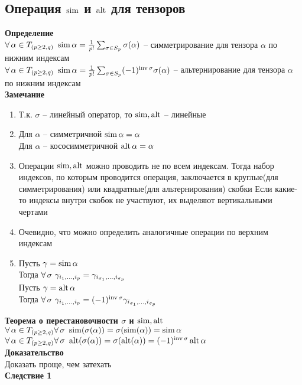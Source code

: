 \documentclass[12pt]{article}
\begin{document}
\subsection{Операция $\operatorname{sim}$ и $\operatorname{alt}$ для тензоров}
\textbf{Определение}\\
$\forall\, \alpha\in T_{(p \geq 2, q)}\ \operatorname{sim} \alpha = \frac1{p!}\sum_{\sigma\in S_p} \sigma(\alpha)$ -- симметрирование для тензора $\alpha$ по нижним индексам\\
$\forall\, \alpha\in T_{(p \geq 2, q)}\ \operatorname{sim} \alpha = \frac1{p!}\sum_{\sigma\in S_p} (-1)^{\operatorname{inv} \sigma}\sigma(\alpha)$ -- альтернирование для тензора $\alpha$ по нижним индексам\\
\textbf{Замечание}
\begin{enumerate}
    \item Т.к. $\sigma$ -- линейный оператор, то $\operatorname{sim}, \operatorname{alt}$ -- линейные
    \item Для $\alpha$ -- симметричной $\operatorname{sim} \alpha = \alpha$\\
    Для $\alpha$ -- кососимметричной $\operatorname{alt} \alpha = \alpha$
    \item Операции $\operatorname{sim}, \operatorname{alt}$ можно проводить не по всем индексам. Тогда набор индексов, по которым проводится операция, заключается в круглые(для симметрирования) или квадратные(для альтернирования) скобки
    Если какие-то индексы внутри скобок не участвуют, их выделяют вертикальными чертами
    \item Очевидно, что можно определить аналогичные операции по верхним индексам
    \item Пусть $\gamma = \operatorname{sim} \alpha$\\
    Тогда $\forall\, \sigma\ \gamma_{i_1,\ldots, i_p} = \gamma_{i_{\sigma_1},\ldots,i_{\sigma_p}}$\\
    Пусть $\gamma = \operatorname{alt} \alpha$\\
    Тогда $\forall\, \sigma\ \gamma_{i_1,\ldots, i_p} = (-1)^{\operatorname{inv} \sigma}\gamma_{i_{\sigma_1},\ldots,i_{\sigma_p}}$
\end{enumerate}
\textbf{Теорема о перестановочности $\sigma$ и $\operatorname{sim}, \operatorname{alt}$}\\
$\forall\, \alpha \in T_{(p \geq 2,q)} \forall\, \sigma\ \operatorname{sim}(\sigma(\alpha)) = \sigma(\operatorname{sim}(\alpha)) = \operatorname{sim} \alpha$
$\forall\, \alpha \in T_{(p \geq 2,q)} \forall\, \sigma\ \operatorname{alt}(\sigma(\alpha)) = \sigma(\operatorname{alt}(\alpha)) = (-1)^{\operatorname{inv} \sigma}\operatorname{alt} \alpha$\\
\textbf{Доказательство}\\
Доказать проще, чем затехать\\
\textbf{Следствие 1}\\
\end{document}
